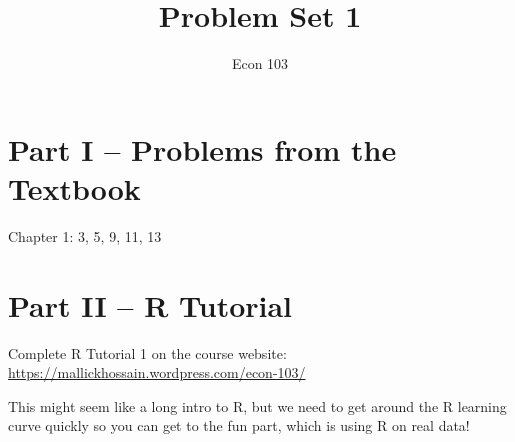 \documentclass[addpoints,12pt]{exam}
\title{Problem Set 1}
\author{Econ 103}
\date{}
\begin{document}
\maketitle

\section*{Part I -- Problems from the Textbook}
Chapter 1: 3, 5, 9, 11, 13

 \section*{Part II -- R Tutorial}
Complete R Tutorial 1 on the course website:
\\
\url{https://mallickhossain.wordpress.com/econ-103/}

This might seem like a long intro to R, but we need to get around the R learning curve quickly so you can get to the fun part, which is using R on real data!
\end{document}
